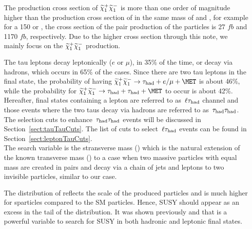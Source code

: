 The production cross section of $\widetilde{\chi}_{1}^{+}\widetilde{\chi}_{1}^{-}$ is more than one order of magnitude higher than the
production cross section of \sTau\sTau in the same mass of \sTau and \PSGcpDo,  
for example for a 150 \GeVcc \sTau or \PSGcpDo, the cross section 
of the pair production of the particles is 27 $fb$ and 1170 $fb$, respectively. Due to the higher cross section through this note, 
we mainly focus on the $\widetilde{\chi}_{1}^{+}\widetilde{\chi}_{1}^{-}$ production. 

The tau leptons decay leptonically ($e$ or $\mu$), in 35\% of the time, or decay via hadrons, which occurs in 65\% of the cases. Since there are two tau leptons in the final state, the probability of having $\PSGcpDo\PSGcmDo \rightarrow \hadtau+e/\mu+\MET$ is about 46\%, while the probability for $\PSGcpDo\PSGcmDo \rightarrow \hadtau+\hadtau+\MET$ to occur is about 42\%. Hereafter, final states containing a lepton are referred to as $\,\ell\tau_{\rm had}$ channel and those events where the two taus decay via hadrons are referred to as $\,\tau_{\rm had}\tau_{\rm had}$. The selection cuts to enhance $\,\tau_{\rm had}\tau_{\rm had}$ events will be discussed in Section~\ref{sect:tauTauCuts}. The list of cuts to select $\,\ell\tau_{\rm had}$ events can be found in Section~\ref{sect:leptonTauCuts}.\\     

The search variable is the stransverse mass (\mttwo) which is the natural extension of the known transverse mass (\mt) to a case 
when two massive particles with equal mass are created in pairs and decay via a chain of jets and leptons to two 
invisible particles, similar to our case.

The distribution of \mttwo reflects the scale of the produced particles and is much higher for sparticles
compared to the SM particles. Hence, SUSY should appear as an excess in the tail of the \mttwo distribution.
It was shown previously \cite{MT2_2011} and \cite{CMS-PAS-SUS-13-006} that \mttwo is a powerful variable to search for SUSY in both
hadronic and leptonic final states.

